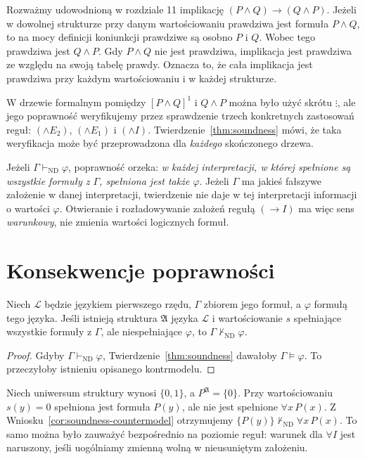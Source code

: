 \begin{przyklad}
Rozważmy udowodnioną w rozdziale 11 implikację
$(P\land Q)\to(Q\land P)$. Jeżeli w dowolnej strukturze
przy danym wartościowaniu prawdziwa jest formuła $P\land Q$,
to na mocy definicji koniunkcji prawdziwe są osobno $P$ i $Q$.
Wobec tego prawdziwa jest $Q\land P$. Gdy $P\land Q$
nie jest prawdziwa, implikacja jest prawdziwa ze względu na
swoją tabelę prawdy. Oznacza to, że cała implikacja jest
prawdziwa przy każdym wartościowaniu i w każdej strukturze.

W drzewie formalnym pomiędzy $[P\land Q]^1$ i $Q\land P$
można było użyć skrótu $\vdots$, ale jego poprawność
weryfikujemy przez sprawdzenie trzech konkretnych zastosowań
reguł: $(\land E_2)$, $(\land E_1)$ i $(\land I)$.
Twierdzenie~\ref{thm:soundness} mówi, że taka weryfikacja
może być przeprowadzona dla \emph{każdego} skończonego drzewa.
\end{przyklad}

\begin{uwaga}
Jeżeli $\Gamma\vdash_{\mathrm{ND}}\varphi$, poprawność orzeka:
\emph{w każdej interpretacji, w której spełnione są wszystkie
formuły z $\Gamma$, spełniona jest także $\varphi$}.
Jeżeli $\Gamma$ ma jakieś fałszywe założenie w danej
interpretacji, twierdzenie nie daje w tej interpretacji
informacji o wartości $\varphi$. Otwieranie i rozładowywanie
założeń regułą $(\to I)$ ma więc sens \emph{warunkowy},
nie zmienia wartości logicznych formuł.
\end{uwaga}

\section{Konsekwencje poprawności}
\begin{wniosek}
\label{cor:soundness-countermodel}
Niech $\mathcal L$ będzie językiem pierwszego rzędu,
$\Gamma$ zbiorem jego formuł, a $\varphi$ formułą
tego języka. Jeśli istnieją struktura $\mathfrak A$
języka $\mathcal L$ i wartościowanie $s$
spełniające wszystkie formuły z $\Gamma$, ale niespełniające
$\varphi$, to $\Gamma\nvdash_{\mathrm{ND}}\varphi$.
\end{wniosek}
\begin{proof}
Gdyby $\Gamma\vdash_{\mathrm{ND}}\varphi$,
Twierdzenie~\ref{thm:soundness} dawałoby
$\Gamma\models\varphi$. To przeczyłoby istnieniu
opisanego kontrmodelu.
\end{proof}
\begin{przyklad}
Niech uniwersum struktury wynosi $\{0,1\}$,
a $P^{\mathfrak A}=\{0\}$. Przy wartościowaniu
$s(y)=0$ spełniona jest formuła $P(y)$,
ale nie jest spełnione $\forall x\,P(x)$.
Z Wniosku~\ref{cor:soundness-countermodel} otrzymujemy
$\{P(y)\}\nvdash_{\mathrm{ND}}\forall x\,P(x)$.
To samo można było zauważyć bezpośrednio na poziomie
reguł: warunek dla $\forall I$ jest naruszony, jeśli
uogólniamy zmienną wolną w nieusuniętym założeniu.
\end{przyklad}

